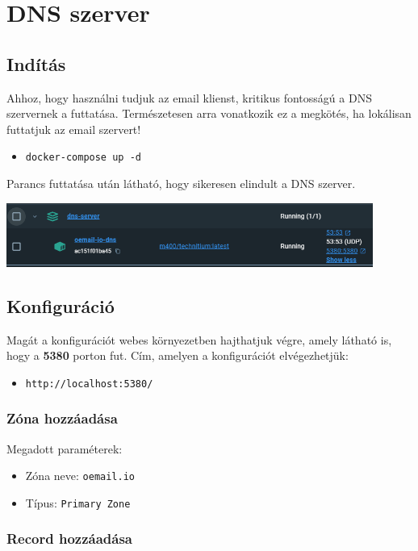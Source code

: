 ﻿\graphicspath{ {./assets/} }

\chapter{DNS szerver}

\section{Indítás}
Ahhoz, hogy használni tudjuk az email klienst, kritikus fontosságú a DNS szervernek a futtatása. Természetesen arra vonatkozik ez a megkötés, ha lokálisan futtatjuk az email szervert!
\begin{itemize}
    \item \verb|docker-compose up -d|
\end{itemize}

\begin{flushleft}
    Parancs futtatása után látható, hogy sikeresen elindult a DNS szerver.
    \begin{center}
        \includegraphics[width=0.9\textwidth]{docker-up-dns-server.png}
    \end{center}
\end{flushleft}

\section{Konfiguráció}
\begin{flushleft}
    Magát a konfigurációt webes környezetben hajthatjuk végre, amely látható is, hogy a \textbf{5380} porton fut. Cím, amelyen a konfigurációt elvégezhetjük:
    \begin{itemize}
        \item \verb|http://localhost:5380/|
    \end{itemize}
\end{flushleft}

\subsection{Zóna hozzáadása}
Megadott paraméterek:
\begin{itemize}
    \item Zóna neve: \verb|oemail.io|
    \item Típus: \verb|Primary Zone|
\end{itemize}

\subsection{Record hozzáadása}